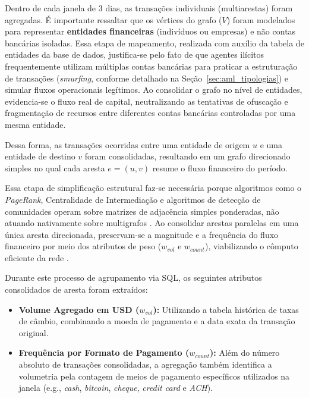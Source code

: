 \documentclass[titlepage,a4paper,oneside,onecolumn,12pt]{report}
\begin{document}
Dentro de cada janela de 3 dias, as transações individuais (multiarestas) foram agregadas. É importante ressaltar que os vértices do grafo ($V$) foram modelados para representar \textbf{entidades financeiras} (indivíduos ou empresas) e não contas bancárias isoladas. Essa etapa de mapeamento, realizada com auxílio da tabela de entidades da base de dados, justifica-se pelo fato de que agentes ilícitos frequentemente utilizam múltiplas contas bancárias para praticar a estruturação de transações (\textit{smurfing}, conforme detalhado na Seção~\ref{sec:aml_tipologias}) e simular fluxos operacionais legítimos. Ao consolidar o grafo no nível de entidades, evidencia-se o fluxo real de capital, neutralizando as tentativas de ofuscação e fragmentação de recursos entre diferentes contas bancárias controladas por uma mesma entidade.

Dessa forma, as transações ocorridas entre uma entidade de origem $u$ e uma entidade de destino $v$ foram consolidadas, resultando em um grafo direcionado simples no qual cada aresta $e = (u, v)$ resume o fluxo financeiro do período.

Essa etapa de simplificação estrutural faz-se necessária porque algoritmos como o \textit{PageRank}, Centralidade de Intermediação e algoritmos de detecção de comunidades operam sobre matrizes de adjacência simples ponderadas, não atuando nativamente sobre multigrafos \cite{baigabyl2025using}. Ao consolidar arestas paralelas em uma única aresta direcionada, preservam-se a magnitude e a frequência do fluxo financeiro por meio dos atributos de peso ($w_{vol}$ e $w_{count}$), viabilizando o cômputo eficiente da rede \cite{vilella2025weirdnodes}.

Durante este processo de agrupamento via SQL, os seguintes atributos consolidados de aresta foram extraídos:

\begin{itemize}
    \item \textbf{Volume Agregado em USD ($w_{vol}$):} Utilizando a tabela histórica de taxas de câmbio, combinando a moeda de pagamento e a data exata da transação original.
    \item \textbf{Frequência por Formato de Pagamento ($w_{count}$):} Além do número absoluto de transações consolidadas, a agregação também identifica a volumetria pela contagem de meios de pagamento específicos utilizados na janela (e.g., \textit{cash}, \textit{bitcoin}, \textit{cheque}, \textit{credit card} e \textit{ACH}). 
\end{itemize}
\end{document}
